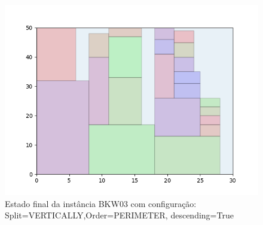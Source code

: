 \begin{figure}[H]
    \centering
    \caption[]{Estado final da instância BKW03 com configuração: Split=VERTICALLY,Order=PERIMETER, descending=True}
    \label{fig:bkw03-vertically-perimeter-true}
    \includegraphics[scale=0.5]{output/figures/bkw/bkw03/vertically/perimeter/true/00}
\end{figure}
